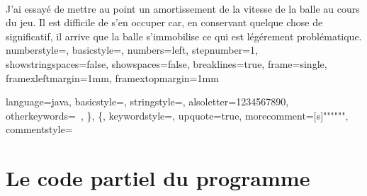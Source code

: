 \documentclass[a4paper,12pt]{report}
\begin{document}
\paragraph{}
J'ai essayé de mettre au point un amortissement de la vitesse de la balle au cours du jeu. Il est difficile de s'en occuper car, en conservant quelque chose de significatif, il arrive que la balle s'immobilise ce qui est légérement problématique.
\lstset
{
	numberstyle=\footnotesize,
	basicstyle=\ttfamily\footnotesize,
	numbers=left,
	stepnumber=1,
	showstringspaces=false,
	showspaces=false,
	breaklines=true,
	frame=single,
	framexleftmargin=1mm,
	framextopmargin=1mm
}


\lstset{language=Java}
\lstset
{
	language=java,
	basicstyle=\ttfamily\footnotesize,
	stringstyle=\color{red},
	alsoletter={1234567890},
	otherkeywords={\ , \}, \{},
	keywordstyle=\color{blue},
	upquote=true,
	morecomment=[s]{"""}{"""},
	commentstyle=\color{gray}\slshape
}

\part{Le code partiel du programme}
	\setcounter{chapter}{0}
	
	
\end{document}
